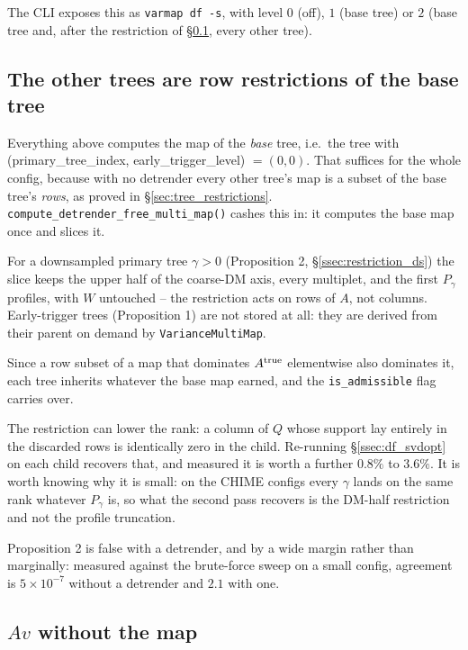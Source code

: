 \documentclass{article}
\numberwithin{equation}{section}   %
\begin{document}
The CLI exposes this as {\tt varmap df -s}, with level $0$ (off), $1$ (base tree) or $2$ (base
tree and, after the restriction of \S\ref{ssec:df_multimap}, every other tree).

\subsection{The other trees are row restrictions of the base tree}
\label{ssec:df_multimap}

Everything above computes the map of the {\em base} tree, i.e.\ the tree with
(primary\_tree\_index, early\_trigger\_level) $= (0,0)$. That suffices for the whole config,
because with no detrender every other tree's map is a subset of the base tree's {\em rows}, as
proved in \S\ref{sec:tree_restrictions}. \verb|compute_detrender_free_multi_map()| cashes this in:
it computes the base map once and slices it.

For a downsampled primary tree $\gamma > 0$ (Proposition 2, \S\ref{ssec:restriction_ds}) the
slice keeps the upper half of the coarse-DM axis, every multiplet, and the first $P_\gamma$
profiles, with $W$ untouched -- the restriction acts on rows of $A$, not columns. Early-trigger
trees (Proposition 1) are not stored at all: they are derived from their parent on demand by
\verb|VarianceMultiMap|.

Since a row subset of a map that dominates $A^{\rm true}$ elementwise also dominates it, each
tree inherits whatever the base map earned, and the {\tt is\_admissible} flag carries over.

The restriction can lower the rank: a column of $Q$ whose support lay entirely in the discarded
rows is identically zero in the child. Re-running \S\ref{ssec:df_svdopt} on each child recovers
that, and measured it is worth a further $0.8\%$ to $3.6\%$. It is worth knowing why it is
small: on the CHIME configs every $\gamma$ lands on the same rank whatever $P_\gamma$ is, so what
the second pass recovers is the DM-half restriction and not the profile truncation.

Proposition 2 is false with a detrender, and by a wide margin rather than marginally: measured
against the brute-force sweep on a small config, agreement is $5 \times 10^{-7}$ without a
detrender and $2.1$ with one.

\subsection{$Av$ without the map}
\label{ssec:df_varfine}
\end{document}
